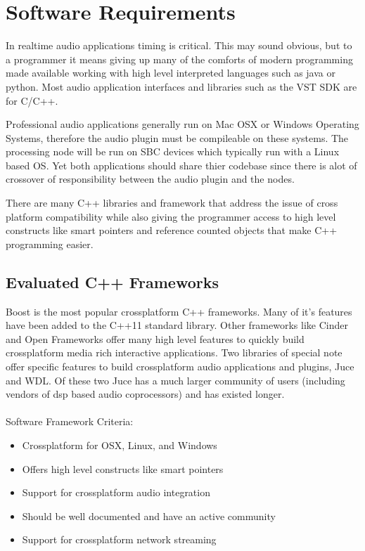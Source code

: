 \section{Software Requirements}

In realtime audio applications timing is critical. This may sound obvious, but to a programmer it means giving up many of the comforts of modern programming made available working with high level interpreted languages such as java or python. Most audio application interfaces and libraries such as the VST SDK are for C/C++.

Professional audio applications generally run on Mac OSX or Windows Operating Systems, therefore the audio plugin must be compileable on these systems. The processing node will be run on SBC devices which typically run with a Linux based OS. Yet both applications should share thier codebase since there is alot of crossover of responsibility between the audio plugin and the nodes.

There are many C++ libraries and framework that address the issue of cross platform compatibility while also giving the programmer access to high level constructs like smart pointers and reference counted objects that make C++ programming easier.

\subsection{Evaluated C++ Frameworks}

Boost is the most popular crossplatform C++ frameworks. Many of it's features have been added to the C++11 standard library. Other frameworks like Cinder and Open Frameworks offer many high level features to quickly build crossplatform media rich interactive applications. Two libraries of special note offer specific features to build crossplatform audio applications and plugins, Juce and WDL. Of these two Juce has a much larger community of users (including vendors of dsp based audio coprocessors) and has existed longer. \\
\\
\noindent
Software Framework Criteria:

\begin{itemize}

\item Crossplatform for OSX, Linux, and Windows
\item Offers high level constructs like smart pointers
\item Support for crossplatform audio integration
\item Should be well documented and have an active community
\item Support for crossplatform network streaming

\end{itemize}


